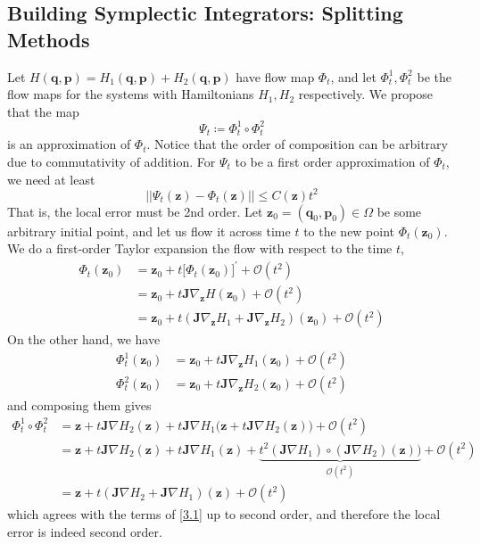   \subsection{Building Symplectic Integrators: Splitting Methods}

    Let $H(\mathbf{q}, \mathbf{p}) = H_1 (\mathbf{q}, \mathbf{p}) + H_2 (\mathbf{q}, \mathbf{p})$ have flow map $\Phi_t$, and let $\Phi_t^1, \Phi_t^2$ be the flow maps for the systems with Hamiltonians $H_1, H_2$ respectively. We propose that the map 
    \begin{equation}
      \Psi_t \coloneqq \Phi_t^1 \circ \Phi_t^2
    \end{equation}
    is an approximation of $\Phi_t$. Notice that the order of composition can be arbitrary due to commutativity of addition. For $\Psi_t$ to be a first order approximation of $\Phi_t$, we need at least 
    \begin{equation}
      ||\Psi_t (\mathbf{z}) - \Phi_t (\mathbf{z}) || \leq C(\mathbf{z}) t^2
    \end{equation}
    That is, the local error must be 2nd order. Let $\mathbf{z}_0 = (\mathbf{q}_0, \mathbf{p}_0) \in \Omega$ be some arbitrary initial point, and let us flow it across time $t$ to the new point $\Phi_t (\mathbf{z}_0)$. We do a first-order Taylor expansion the flow with respect to the time $t$, 
    \begin{align*}
      \Phi_t (\mathbf{z}_0) & = \mathbf{z}_0 + t \big[\Phi_t (\mathbf{z}_0)\big]^\prime + \mathcal{O}(t^2) \\
      & = \mathbf{z}_0 + t \mathbf{J} \nabla_\mathbf{z} H(\mathbf{z}_0) + \mathcal{O}(t^2) \\
      & = \mathbf{z}_0 + t (\mathbf{J} \nabla_\mathbf{z} H_1 + \mathbf{J} \nabla_\mathbf{z} H_2) (\mathbf{z}_0) + \mathcal{O}(t^2) \tag{3.1} \label{3.1}
    \end{align*}
    On the other hand, we have
    \begin{align*}
      \Phi_t^1 (\mathbf{z}_0) & = \mathbf{z}_0 + t \mathbf{J} \nabla_\mathbf{z} H_1 (\mathbf{z}_0) + \mathcal{O}(t^2) \\
      \Phi_t^2 (\mathbf{z}_0) & = \mathbf{z}_0 + t \mathbf{J} \nabla_\mathbf{z} H_2 (\mathbf{z}_0) + \mathcal{O}(t^2) 
    \end{align*}
    and composing them gives 
    \begin{align*}
      \Phi_t^1 \circ \Phi_t^2 & = \mathbf{z} + t \mathbf{J} \nabla H_2 (\mathbf{z}) + t\mathbf{J} \nabla H_1 \big( \mathbf{z} + t \mathbf{J} \nabla H_2 (\mathbf{z}) \big) + \mathcal{O}(t^2) \\
      & = \mathbf{z} + t \mathbf{J} \nabla H_2 (\mathbf{z}) + t \mathbf{J} \nabla H_1 (\mathbf{z}) + \underbrace{t^2 (\mathbf{J} \nabla H_1) \circ (\mathbf{J} \nabla H_2)  (\mathbf{z})\big)}_{\mathcal{O}(t^2)} + \mathcal{O}(t^2) \\
      & = \mathbf{z} + t (\mathbf{J} \nabla H_2 + \mathbf{J} \nabla H_1) (\mathbf{z}) + \mathcal{O}(t^2)
    \end{align*}
    which agrees with the terms of \eqref{3.1} up to second order, and therefore the local error is indeed second order. 

